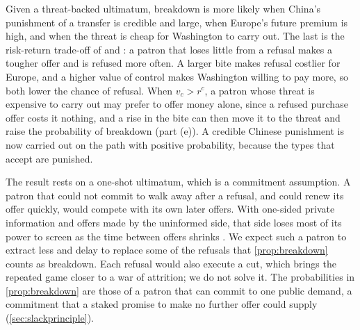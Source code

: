 Given a threat-backed ultimatum, breakdown is more likely when China's punishment of a transfer is credible and large, when Europe's future premium is high, and when the threat is cheap for Washington to carry out. The last is the risk-return trade-off of \citet{fearon1995rationalist} and \citet{powell1999shadow}: a patron that loses little from a refusal makes a tougher offer and is refused more often. A larger bite makes refusal costlier for Europe, and a higher value of control makes Washington willing to pay more, so both lower the chance of refusal. When $v_c>r^c$, a patron whose threat is expensive to carry out may prefer to offer money alone, since a refused purchase offer costs it nothing, and a rise in the bite can then move it to the threat and raise the probability of breakdown (part (e)). A credible Chinese punishment is now carried out on the path with positive probability, because the types that accept are punished.

The result rests on a one-shot ultimatum, which is a commitment assumption. A patron that could not commit to walk away after a refusal, and could renew its offer quickly, would compete with its own later offers. With one-sided private information and offers made by the uninformed side, that side loses most of its power to screen as the time between offers shrinks \citep{fudenberg1985infinite, gul1986foundations}. We expect such a patron to extract less and delay to replace some of the refusals that \cref{prop:breakdown} counts as breakdown. Each refusal would also execute a cut, which brings the repeated game closer to a war of attrition; we do not solve it. The probabilities in \cref{prop:breakdown} are those of a patron that can commit to one public demand, a commitment that a staked promise to make no further offer could supply (\cref{sec:slackprinciple}).
